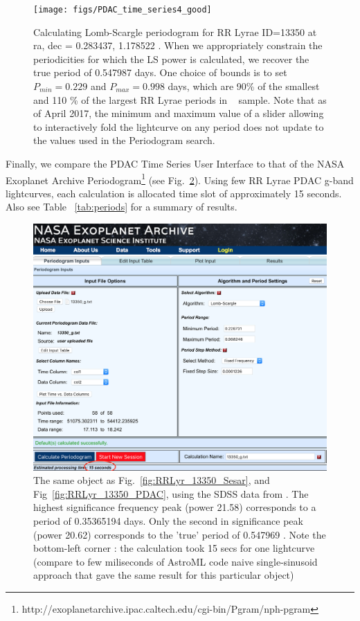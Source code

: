 \documentclass[fleqn,usenatbib]{mnras} %
\begin{document}
\begin{figure}
\texttt{[image: figs/PDAC\_time\_series4\_good]}
\caption{Calculating Lomb-Scargle periodogram for RR Lyrae ID=13350  at  ra, dec = 0.283437, 1.178522 . When we appropriately constrain the periodicities for which the LS power is calculated, we recover the true period of  0.547987 days.  One choice of bounds is to  set $P_{min} =  0.229 $ and $P_{max} = 0.998$ days, which are 90\% of the smallest and 110 \% of the largest RR Lyrae periods in ~\citep{sesar2010} sample. Note that as of April 2017, the minimum and maximum value of a slider allowing to interactively fold the lightcurve on any period does not update to the values used in the Periodogram search.}
\label{fig:time_series4g}
\end{figure}





Finally, we compare the PDAC Time Series User Interface to that of the  NASA Exoplanet Archive Periodogram\footnote{http://exoplanetarchive.ipac.caltech.edu/cgi-bin/Pgram/nph-pgram} (see Fig.~\ref{fig:exoplanet_archive}). Using few RR Lyrae PDAC g-band  lightcurves, each calculation is allocated time slot of approximately 15 seconds. Also see Table ~\ref{tab:periods} for a summary of results. 

\begin{figure}
\includegraphics[width=\textwidth]{figs/Exoplanet_archive_periodogram}
\caption{ The same object as Fig.~\ref{fig:RRLyr_13350_Sesar}, and Fig~\ref{fig:RRLyr_13350_PDAC},  using  the SDSS data from \citep{sesar2010}.  The highest significance frequency peak (power 21.58) corresponds to  a period of 0.35365194 days. Only the second in significance peak (power 20.62) corresponds to the 'true' period of 0.547969 \citep{sesar2010}. Note the bottom-left corner : the calculation took 15 secs for one lightcurve (compare to few miliseconds of AstroML code naive single-sinusoid approach that gave the same result for this particular object) }
\label{fig:exoplanet_archive}
\end{figure}
\end{document}
